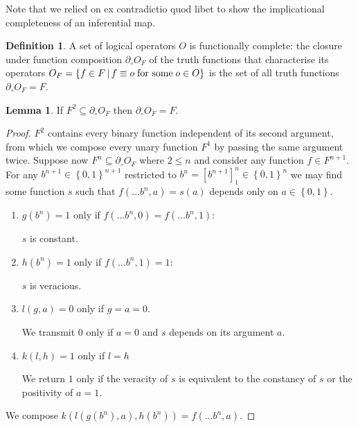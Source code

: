 \documentclass{amsbook}
\newcommand{\setsm}[1]{\left\{#1\right\}}
\theoremstyle{definition}
\newtheorem{lmm}{Lemma}[section]
\newtheorem{dfn}{Definition}[section]
\begin{document}
Note that we relied on ex contradictio quod libet to show the implicational completeness of an inferential map.

\begin{dfn}
    A set of logical operators $O$ is functionally complete: the closure under function composition $\partial_\circ O_F$ of the truth functions that characterise its operators $O_F = \left\{ f \in F \,|\, f \equiv o \text{\;for some\;} o \in O \right\}$ is the set of all truth functions $\partial_\circ O_F = F$.
\end{dfn}

\begin{lmm}
    If $F^2 \subseteq \partial_\circ O_F$ then $\partial_\circ O_F = F$.
    \begin{proof}
        $F^2$ contains every binary function independent of its second argument, from which we compose every unary function $F^1$ by passing the same argument twice.
        Suppose now $F^n \subseteq \partial_\circ O_F$ where $2 \leq n$ and consider any function $f \in F^{n+1}$. For any $b^{n+1} \in \setsm{0,1}^{n+1}$ restricted to $b^n = [b^{n+1}]_1^n \in \setsm{0,1}^n$ we may find some function $s$ such that $f(\dots b^n, a) = s(a)$ depends only on $a \in \setsm{0,1}$.
        \begin{enumerate}
            \item $g(b^n) = 1$ only if $f(\dots b^n, 0) = f(\dots b^n, 1)$:

                  $s$ is constant.
            \item $h(b^n) = 1$ only if $f(\dots b^n, 1) = 1$:

                  $s$ is veracious.
            \item $l(g, a) = 0$ only if $g = a = 0$.

                  We transmit $0$ only if $a = 0$ and $s$ depends on its argument $a$.
            \item $k(l, h) = 1$ only if $l = h$

                  We return $1$ only if the veracity of $s$ is equivalent to the constancy of $s$ or the positivity of $a = 1$.
        \end{enumerate}

        We compose $k\left( l\left( g(b^n), a \right), h(b^n) \right) = f(\dots b^n, a)$.
    \end{proof}
\end{lmm}
\end{document}
